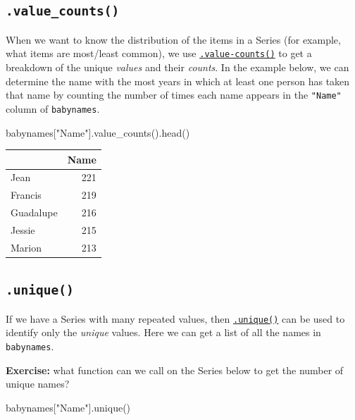\documentclass[
  letterpaper,
  DIV=11,
  numbers=noendperiod]{scrreprt}
\newenvironment{Shaded}{\begin{snugshade}}{\end{snugshade}}
\newcommand{\NormalTok}[1]{\textcolor[rgb]{0.00,0.23,0.31}{#1}}
\newcommand{\StringTok}[1]{\textcolor[rgb]{0.13,0.47,0.30}{#1}}
\begin{document}
\hypertarget{value_counts}{%
\subsection{\texorpdfstring{\texttt{.value\_counts()}}{.value\_counts()}}\label{value_counts}}

When we want to know the distribution of the items in a Series (for
example, what items are most/least common), we use
\href{https://pandas.pydata.org/docs/reference/api/pandas.Series.value_counts.html}{\texttt{.value-counts()}}
to get a breakdown of the unique \emph{values} and their \emph{counts}.
In the example below, we can determine the name with the most years in
which at least one person has taken that name by counting the number of
times each name appears in the \texttt{"Name"} column of
\texttt{babynames}.

\begin{Shaded}
\begin{Highlighting}[]
\NormalTok{babynames[}\StringTok{"Name"}\NormalTok{].value\_counts().head()}
\end{Highlighting}
\end{Shaded}

\begin{tabular}{lr}
\toprule
{} &  Name \\
\midrule
Jean      &   221 \\
Francis   &   219 \\
Guadalupe &   216 \\
Jessie    &   215 \\
Marion    &   213 \\
\bottomrule
\end{tabular}

\hypertarget{unique}{%
\subsection{\texorpdfstring{\texttt{.unique()}}{.unique()}}\label{unique}}

If we have a Series with many repeated values, then
\href{https://pandas.pydata.org/docs/reference/api/pandas.unique.html}{\texttt{.unique()}}
can be used to identify only the \emph{unique} values. Here we can get a
list of all the names in \texttt{babynames}.

\textbf{Exercise:} what function can we call on the Series below to get
the number of unique names?

\begin{Shaded}
\begin{Highlighting}[]
\NormalTok{babynames[}\StringTok{"Name"}\NormalTok{].unique()}
\end{Highlighting}
\end{Shaded}
\end{document}
